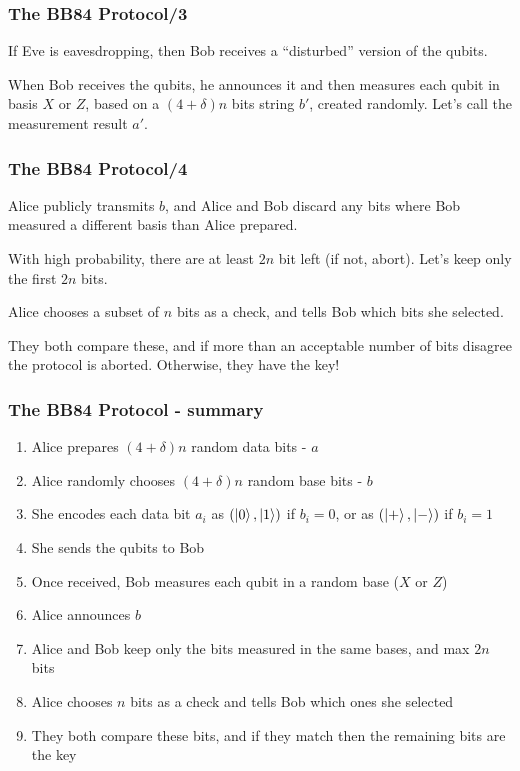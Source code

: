 \documentclass{beamer}
\begin{document}
  \begin{frame}
    \frametitle{The BB84 Protocol/3}
    If Eve is eavesdropping, then Bob receives a ``disturbed'' version of the qubits.

    When Bob receives the qubits, he announces it and then
    measures each qubit in basis $X$ or $Z$, based on a $(4+\delta)n$ bits
    string $b'$, created randomly. Let's call the measurement result $a'$.
  \end{frame}

  \begin{frame}
    \frametitle{The BB84 Protocol/4}
    Alice publicly transmits $b$, and Alice and Bob discard any bits where Bob measured
    a different basis than Alice prepared.

    With high probability, there are at least $2n$ bit left (if not, abort). Let's keep only the first $2n$ bits.

    Alice chooses a subset of $n$ bits as a check, and tells Bob which bits she selected.
    
    
    They both compare these, and if more than an acceptable number of bits disagree the protocol is aborted.
    Otherwise, they have the key!
  \end{frame}

  \begin{frame}
    \frametitle{The BB84 Protocol - summary}
    \begin{enumerate}
      \item Alice prepares $(4 + \delta)n$ random data bits - $a$
      \item Alice randomly chooses $(4 + \delta)n$ random base bits - $b$
      \item She encodes each data bit $a_i$ as $(\ket0, \ket1)$ if $b_i = 0$, or as $(\ket+, \ket-)$ if $b_i = 1$
      \item She sends the qubits to Bob
      \item Once received, Bob measures each qubit in a random base ($X$ or $Z$)
      \item Alice announces $b$
      \item Alice and Bob keep only the bits measured in the same bases, and max $2n$ bits
      \item Alice chooses $n$ bits as a check and tells Bob which ones she selected
      \item They both compare these bits, and if they match then the remaining bits are the key
    \end{enumerate}  
  \end{frame}
\end{document}
